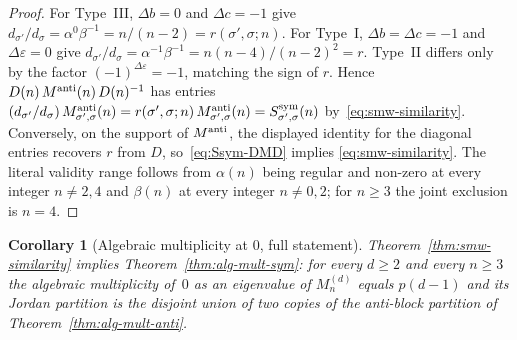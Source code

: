 \documentclass{amsart}
\newtheorem{corollary}[theorem]{Corollary}
\theoremstyle{definition}
\theoremstyle{remark}
\begin{document}
\begin{proof}
For Type~III, $\Delta b = 0$ and $\Delta c = -1$ give
$d_{\sigma'}/d_\sigma = \alpha^0 \beta^{-1} = n/(n-2)
 = r(\sigma',\sigma; n)$.  For Type~I, $\Delta b = \Delta c = -1$
and $\Delta\varepsilon = 0$ give
$d_{\sigma'}/d_\sigma = \alpha^{-1}\beta^{-1}
 = n(n-4)/(n-2)^2 = r$.  Type~II differs only by the factor
$(-1)^{\Delta\varepsilon} = -1$, matching the sign of $r$.
Hence $D(n)\,M^{\rm anti}(n)\,D(n)^{-1}$ has entries
$(d_{\sigma'}/d_\sigma)\,M^{\rm anti}_{\sigma',\sigma}(n)
 = r(\sigma',\sigma; n)\,M^{\rm anti}_{\sigma',\sigma}(n)
 = S^{\rm sym}_{\sigma',\sigma}(n)$
by~\eqref{eq:smw-similarity}.  Conversely, on the support of
$M^{\rm anti}$, the displayed identity for the diagonal entries
recovers $r$ from $D$, so~\eqref{eq:Ssym-DMD} implies
\eqref{eq:smw-similarity}.  The literal validity range follows
from $\alpha(n)$ being regular and non-zero at every integer
$n \ne 2, 4$ and $\beta(n)$ at every integer $n \ne 0, 2$;
for $n \ge 3$ the joint exclusion is $n = 4$.
\end{proof}

\begin{corollary}[Algebraic multiplicity at $0$, full statement]
\label{prop:smw-similarity-implies-amult}
Theorem~\ref{thm:smw-similarity} implies
Theorem~\ref{thm:alg-mult-sym}: for every $d \ge 2$ and every
$n \ge 3$ the algebraic multiplicity of~$0$ as an eigenvalue
of $M_n^{(d)}$ equals $p(d-1)$ and its Jordan partition is the
disjoint union of two copies of the anti-block partition of
Theorem~\ref{thm:alg-mult-anti}.
\end{corollary}
\end{document}
